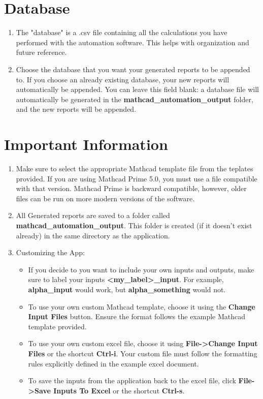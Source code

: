 \documentclass[11pt]{article}
\begin{document}
\section{Database}
\label{sec:org1161bc3}
\begin{enumerate}
\item The "database" is a .csv file containing all the calculations you have performed with the automation software. This helps with organization and future reference.
\item Choose the database that you want your generated reports to be appended to. If you choose an already existing database, your new reports will automatically be appended. You can leave this field blank: a database file will automatically be generated in the \textbf{mathcad\_automation\_output} folder, and the new reports will be appended.
\end{enumerate}
\section{Important Information}
\label{sec:org35d0abc}
\begin{enumerate}
\item Make sure to select the appropriate Mathcad template file from the teplates provided. If you are using Mathcad Prime 5.0, you must use a file compatible with that version. Mathcad Prime is backward compatible, however, older files can be run on more modern versions of the software.
\item All Generated reports are saved to a folder called \textbf{mathcad\_automation\_output}. This folder is created (if it doesn't exist already) in the same directory as the application.
\item Customizing the App:
\begin{itemize}
\item If you decide to you want to include your own inputs and outputs, make sure to label your inputs \textbf{<my\_label>\_input}. For example, \textbf{alpha\_input} would work, but \textbf{alpha\_something} would not.
\item To use your own custom Mathcad template, choose it using the \textbf{Change Input Files} button. Ensure the format follows the example Mathcad template provided.
\item To use your own custom excel file, choose it using \textbf{File->Change Input Files} or the shortcut \textbf{Ctrl-i}. Your custom file must follow the formatting rules explicitly defined in the example excel document.
\item To save the inputs from the application back to the excel file, click \textbf{File->Save Inputs To Excel} or the shortcut \textbf{Ctrl-s}.
\end{itemize}
\end{enumerate}
\end{document}
